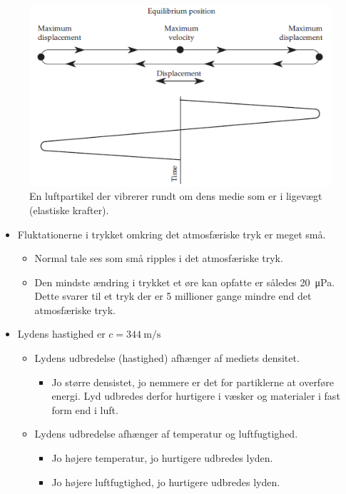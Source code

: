 \begin{figure} [H]
	\centering
	\includegraphics[width=0.85\linewidth]{graphics/1.png}
	\caption{En luftpartikel der vibrerer rundt om dens medie som er i ligevægt (elastiske krafter).}
	\label{fig:1}
\end{figure}

\begin{itemize}
	\item Fluktationerne i trykket omkring det atmosfæriske tryk er meget små.
	\begin{itemize}
		\item Normal tale ses som små ripples i det atmosfæriske tryk.
		\item Den mindste ændring i trykket et øre kan opfatte er således \SI{20}{\micro\pascal}. Dette svarer til et tryk der er 5 millioner gange mindre end det atmosfæriske tryk.
	\end{itemize}
	\item Lydens hastighed er $c = \SI{344}{\meter\per\second}$
	\begin{itemize}
		\item Lydens udbredelse (hastighed) afhænger af mediets densitet.
		\begin{itemize}
			\item Jo større densistet, jo nemmere er det for partiklerne at overføre energi. Lyd udbredes derfor hurtigere i væsker og materialer i fast form end i luft.
		\end{itemize}
		\item Lydens udbredelse afhænger af temperatur og luftfugtighed.
		\begin{itemize}
			\item Jo højere temperatur, jo hurtigere udbredes lyden. 
			\item Jo højere luftfugtighed, jo hurtigere udbredes lyden.
		\end{itemize} 
	\end{itemize}
\end{itemize}

